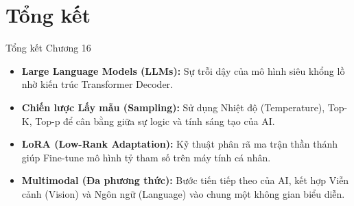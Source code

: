 \documentclass[aspectratio=169]{beamer}
\begin{document}
\section{Tổng kết}

\begin{frame}{Tổng kết Chương 16}
    \begin{itemize}
        \item \textbf{Large Language Models (LLMs):} Sự trỗi dậy của mô hình siêu khổng lồ nhờ kiến trúc Transformer Decoder.
        \item \textbf{Chiến lược Lấy mẫu (Sampling):} Sử dụng Nhiệt độ (Temperature), Top-K, Top-p để cân bằng giữa sự logic và tính sáng tạo của AI.
        \item \textbf{LoRA (Low-Rank Adaptation):} Kỹ thuật phân rã ma trận thần thánh giúp Fine-tune mô hình tỷ tham số trên máy tính cá nhân.
        \item \textbf{Multimodal (Đa phương thức):} Bước tiến tiếp theo của AI, kết hợp Viễn cảnh (Vision) và Ngôn ngữ (Language) vào chung một không gian biểu diễn.
    \end{itemize}
\end{frame}
\end{document}
